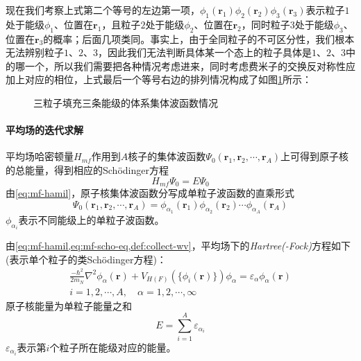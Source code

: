 现在我们考察上式第二个等号的左边第一项，$\phi_1(\bm{r}_1)\phi_2(\bm{r}_2)\phi_3(\bm{r}_3)$表示粒子$1$处于能级$\phi_1$、位置在$\bm{r}_1$，且粒子$2$处于能级$\phi_2$、位置在$\bm{r}_2$，同时粒子$3$处于能级$\phi_3$、位置在$\bm{r}_3$的概率；后面几项类同。事实上，由于全同粒子的不可区分性，我们根本无法辨别粒子$1$、$2$、$3$，因此我们无法判断具体某一个态上的粒子具体是$1$、$2$、$3$中的哪一个，所以我们需要把各种情况考虑进来，同时考虑费米子的交换反对称性应加上对应的相位，上式最后一个等号右边的排列情况构成了如图\ref{fig:three-body-wv}所示：
\begin{figure}[htbp]
	\centering
	
	\caption{三粒子填充三条能级的体系集体波函数情况}
	\label{fig:three-body-wv}
\end{figure}

\paragraph*{平均场的迭代求解}
平均场哈密顿量$H_{mf}$作用到$A$核子的集体波函数$\Psi_0(\bm{r}_1, \bm{r}_2, \cdots, \bm{r}_A)$上可得到原子核的总能量，得到相应的Sch{\"o}dinger方程
\begin{equation}
	H_{mf} \Psi_0 = E \Psi_0
	\label{eq:mf-scho-eq}
\end{equation}
由\cref{eq:mf-hamil}，原子核集体波函数分写成单粒子波函数的直乘形式
\begin{equation}
	\Psi_0(\bm{r}_1, \bm{r}_2, \cdots, \bm{r}_A) = \phi_{\alpha_1}(\bm{r}_1) \phi_{\alpha_2}(\bm{r}_2) \cdots \phi_{\alpha_A}(\bm{r}_A)
	\label{def:collect-wv}
\end{equation}
$\phi_{\alpha_{i}}$表示不同能级上的单粒子波函数。

由\cref{eq:mf-hamil,eq:mf-scho-eq,def:collect-wv}，平均场下的\textsl{Hartree(-Fock)}方程如下(表示单个粒子的类Sch{\"o}dinger方程)：
\begin{equation}\boxed{
    \begin{aligned}
        \frac{-\hbar^{2}}{2m_N} \nabla^{2} \phi_{\alpha}(\bm{r}) + V_{H(F)}\left(
        \{\phi_{i}(\bm{r})\}\right)\phi_{\alpha} = \varepsilon_{\alpha}\phi_{\alpha}(\bm{r}) \\ 
        i = 1, 2, \cdots, A, \quad \alpha = 1, 2, \cdots, \infty
    \end{aligned}
    \label{eq:Hartree-Fock}
}\end{equation}
原子核能量为单粒子能量之和
\begin{equation}
	E = \sum_{i = 1}^{A} \varepsilon_{\alpha_i}
\end{equation}
$\varepsilon_{\alpha_i}$表示第$i$个粒子所在能级对应的能量。

